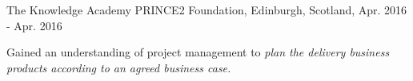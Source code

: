 \begin{cventries}
    \cventry
    {The Knowledge Academy} %
    {PRINCE2 Foundation, } %
    {Edinburgh, Scotland, } %
    {Apr. 2016 - Apr. 2016} %
    {
      \begin{cvitems} %
        \item {Gained an understanding of project management to \textit{plan the delivery business products according to an agreed business case.}}
      \end{cvitems}
    }

\end{cventries}

\begin{comment}
  \cventry
    {Bonn International School} %
    {International Baccalaureate (IB)} %
    {Bonn, Germany} %
    {Sep. 2010 - May. 2012} %
    {
      \begin{cvitems} %
        \item {Took part in "Theory of Knowledge", learned to think critically.}
        \item {Learned time managment skills used for studying a broad change of subjects.
        \item {Conducted individual research experiment in Chemistry which resulted in an "extended essay".}
        \item {Immersed in a diverse culture.}
      \end{cvitems}
    }
\end{comment}

